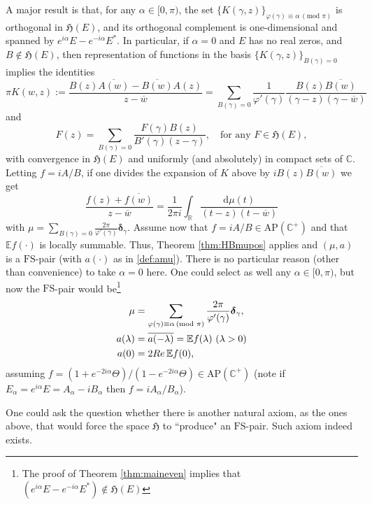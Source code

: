 \documentclass[a4paper,reqno,12pt]{amsart}
\newcommand{\E}{\mathcal{E}}
\renewcommand{\H}{\mathbb{C}^+}
\renewcommand{\r}{\mathbb{R}}
\newcommand{\cp}{\mathbb{C}} %
\newcommand{\re}{{\rm Re}\,}
\newcommand{\bo}{\boldsymbol}
\newcommand{\la}{\lambda}
\newcommand{\ga}{\gamma}
\newcommand{\al}{\alpha}
\newcommand{\p}{\varphi}
\renewcommand{\d}{\mathrm{d}}
\newcommand{\w}{\ov{w}}
\newcommand{\1}{{\bf 1}}
\newcommand{\apc}{\mathrm{AP}(\H)}
\newcommand{\fs}{\mathrm{FS}}
\renewcommand{\E}{\mathbb{E}}
\newcommand{\ov}[1]{\overline{#1}}
\renewcommand{\1}{{\bo 1}}
\newcommand{\del}{{\bo \delta}}
\renewcommand{\a}{a(\cdot)}
\newcommand{\h}{\mathfrak{H}}
\begin{document}
A major result \cite[Thm. 22]{dB} is that, for any $\al\in [0,\pi)$, the set $\{K(\ga,z)\}_{\p(\ga)\equiv \al \, (\text{mod } \pi)}$ is orthogonal in $\h(E)$, and its orthogonal complement is one-dimensional and spanned by $e^{i\al}E-e^{-i\al}E^*$. In particular, if $\al=0$ and $E$ has no real zeros, and $B\notin \h(E)$, then representation of functions in the basis $\{K(\ga,z)\}_{B(\ga)=0}$ implies the identities
$$
\pi K(w,z):=\frac{B(z)\ov{A(w)}-\ov{B(w)}{A(z)}}{z-\w} = \sum_{B(\ga)=0} \frac{1}{\p'(\ga)} \frac{B(z)\ov{B(w)}}{(\ga-z)(\ga-\w)}
$$
and
$$
F(z) = \sum_{B(\ga)=0} \frac{F(\ga)B(z)}{B'(\ga)(z-\ga)}, \quad \text{for any } F\in \h(E),
$$
with convergence in $\h(E)$ and uniformly (and absolutely) in compact sets of $\cp$. Letting $f=iA/B$,  if one divides the expansion of $K$ above by $iB(z)\ov{B(w)}$ we get
$$
\frac{f(z)+\ov{f(w)}}{z-\w} = \frac{1}{2\pi i} \int_\r \frac{\d \mu(t)}{(t-z)(t-\w)}
$$
with $\mu=\sum_{B(\ga)=0} \frac{2\pi}{\p'(\ga)}\del_\ga$.
Assume now that $f=iA/B \in \apc$ and that $\E f(\cdot)$ is locally summable.  Thus, Theorem \ref{thm:HBmupos} applies and $(\mu,a)$ is a $\fs$-pair (with $\a$ as in \eqref{def:amu}). There is no particular reason (other than convenience) to take $\al=0$ here. One could select as well any $\al\in [0,\pi)$, but now the $\fs$-pair would be\footnote{The proof of Theorem \ref{thm:maineven} implies that $(e^{i\al}E-e^{-i\al}E^*)\notin \h(E)$}
\begin{align}
\begin{split}\label{genmuapair}
\mu &= \sum_{\p(\ga)\equiv \al \, (\text{mod } \pi)} \frac{2\pi}{\p'(\ga)}\del_\ga, \\
a(\la) &= \ov{a(-\la)} = \E f (\la) \ (\la >0) \\
 a(0)&=2\re \E f(0),
 \end{split}
\end{align}
assuming $f=(1+e^{-2i\al}\Theta)/(1-e^{-2i\al}\Theta) \in \apc$ (note if $E_\al=e^{i\al}E=A_\al-iB_\al$ then $f=iA_\al/B_\al$).


One could ask the question whether there is another natural axiom, as the ones above, that would force the space $\h$ to ``produce" an $\fs$-pair. Such axiom indeed exists.
\end{document}
